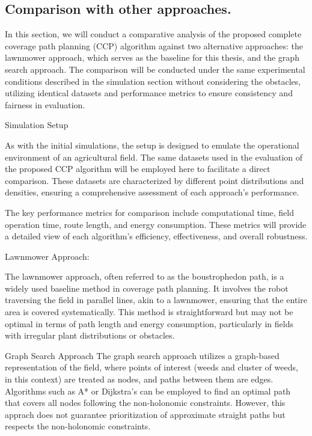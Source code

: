 
\subsection{Comparison with other approaches.}

In this section, we will conduct a comparative analysis of the proposed complete coverage path planning (CCP) algorithm against two alternative approaches: the lawnmower approach, which serves as the baseline for this thesis, and the graph search approach. The comparison will be conducted under the same experimental conditions described in the simulation section without considering the obstacles, utilizing identical datasets and performance metrics to ensure consistency and fairness in evaluation.

\vspace*{6mm}   

Simulation Setup

As with the initial simulations, the setup is designed to emulate the operational environment of an agricultural field. The same datasets used in the evaluation of the proposed CCP algorithm will be employed here to facilitate a direct comparison. These datasets are characterized by different point distributions and densities, ensuring a comprehensive assessment of each approach’s performance.

\vspace*{6mm}   

The key performance metrics for comparison include computational time, field operation time, route length, and energy consumption. These metrics will provide a detailed view of each algorithm's efficiency, effectiveness, and overall robustness.

\vspace*{6mm}   

Lawnmower Approach:


The lawnmower approach, often referred to as the boustrophedon path, is a widely used baseline method in coverage path planning. It involves the robot traversing the field in parallel lines, akin to a lawnmower, ensuring that the entire area is covered systematically. This method is straightforward but may not be optimal in terms of path length and energy consumption, particularly in fields with irregular plant distributions or obstacles.

\vspace*{6mm}   

Graph Search Approach
The graph search approach utilizes a graph-based representation of the field, where points of interest (weeds and cluster of weeds, in this context) are treated as nodes, and paths between them are edges. Algorithms such as A* or Dijkstra's can be employed to find an optimal path that covers all nodes following the non-holonomic constraints. However, this apprach does not guarantee prioritization of approximate straight paths but respects the non-holonomic constraints.  


